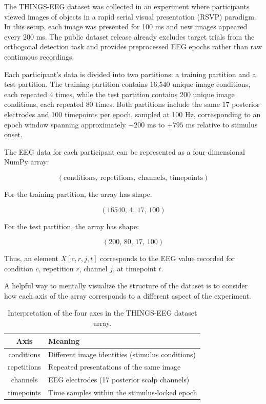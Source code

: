 \documentclass[11pt,letterpaper]{article}
\begin{document}
The THINGS-EEG dataset was collected in an experiment where participants viewed images of objects in a rapid serial visual presentation (RSVP) paradigm. In this setup, each image was presented for 100 ms and new images appeared every 200 ms. The public dataset release already excludes target trials from the orthogonal detection task and provides preprocessed EEG epochs rather than raw continuous recordings.

Each participant’s data is divided into two partitions: a training partition and a test partition. The training partition contains 16,540 unique image conditions, each repeated 4 times, while the test partition contains 200 unique image conditions, each repeated 80 times. Both partitions include the same 17 posterior electrodes and 100 timepoints per epoch, sampled at 100 Hz, corresponding to an epoch window spanning approximately $-200$ ms to $+795$ ms relative to stimulus onset.


The EEG data for each participant can be represented as a four-dimensional NumPy array:

\[
(\text{conditions},\ \text{repetitions},\ \text{channels},\ \text{timepoints})
\]

For the training partition, the array has shape:

\[
(16540,\, 4,\, 17,\, 100)
\]

For the test partition, the array has shape:

\[
(200,\, 80,\, 17,\, 100)
\]

Thus, an element $X[c, r, j, t]$ corresponds to the EEG value recorded for condition $c$, repetition $r$, channel $j$, at timepoint $t$.


A helpful way to mentally visualize the structure of the dataset is to consider how each axis of the array corresponds to a different aspect of the experiment.

\begin{table}[h]
\centering
\begin{tabular}{|c|l|}
\hline
\textbf{Axis} & \textbf{Meaning} \\
\hline
conditions & Different image identities (stimulus conditions) \\
repetitions & Repeated presentations of the same image \\
channels & EEG electrodes (17 posterior scalp channels) \\
timepoints & Time samples within the stimulus-locked epoch \\
\hline
\end{tabular}
\caption{Interpretation of the four axes in the THINGS-EEG dataset array.}
\end{table}
\end{document}
